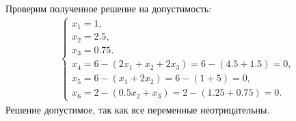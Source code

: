 \documentclass[12pt,a4paper,oneside]{extarticle}
\begin{document}
    Проверим полученное решение на допустимость:
    \begin{gather}
        \begin{cases}
            x_1 = 1,\\
            x_2 = 2.5, \\
            x_3 = 0.75. \\
            x_4 = 6 - (2x_1 + x_2 + 2x_3) = 6 - (4.5 + 1.5)=0, \\
            x_5 = 6 - (x_1 + 2x_2) = 6 - (1+5) = 0,\\
            x_6 = 2 - (0.5x_2 + x_3) = 2 - (1.25+0.75)= 0.
        \end{cases} 
    \end{gather}
    Решение допустимое, так как все переменные неотрицательны.
\end{document}

